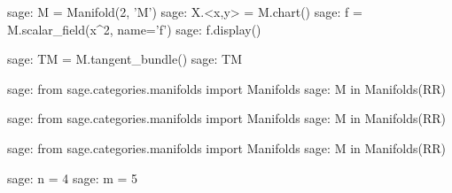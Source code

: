 \documentclass[12pt]{article}
\begin{document}
\lipsum[2-3]
\begin{sagenotebook}
sage: M = Manifold(2, 'M')
sage: X.<x,y> = M.chart()
sage: f = M.scalar_field(x^2, name='f')
sage: f.display()
\end{sagenotebook}
\begin{sagenotebook}
sage: TM = M.tangent_bundle()
sage: TM
\end{sagenotebook}
\begin{sagenotebook}
sage: from sage.categories.manifolds import Manifolds
sage: M in Manifolds(RR)
\end{sagenotebook}
\begin{sagenotebook}
	sage: from sage.categories.manifolds import Manifolds
	sage: M in Manifolds(RR)
\end{sagenotebook}
\lipsum[1]
\begin{sagenotebook}
	sage: from sage.categories.manifolds import Manifolds
	sage: M in Manifolds(RR)
\end{sagenotebook}
\lipsum[7]
\begin{sagenotebook}
sage: n = 4
sage: m = 5
\end{sagenotebook}
\lipsum
\end{document}
